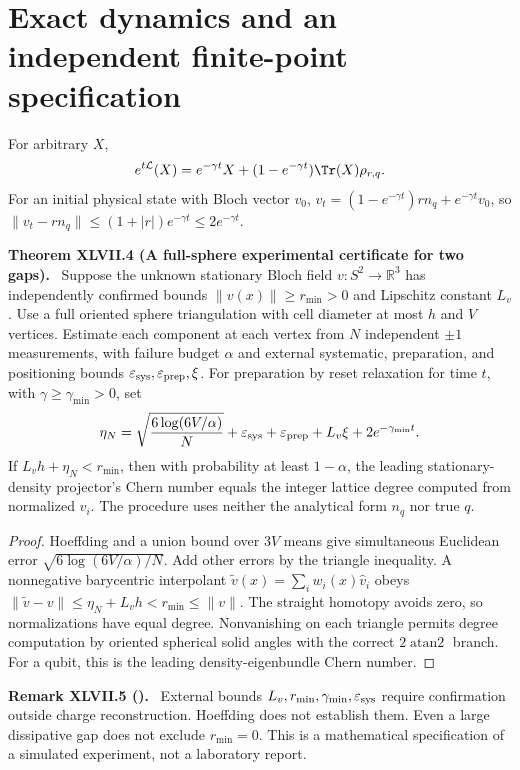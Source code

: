 \documentclass[11pt,a4paper,oneside]{book}
\newcommand{\R}{\mathbb R}\newcommand{\C}{\mathbb C}\newcommand{\Z}{\mathbb Z}\newcommand{\N}{\mathbb N}\newcommand{\Q}{\mathbb Q}
\newcommand{\statement}[3]{\par\medskip\noindent\textbf{#1 #2 (#3).}\ }
\begin{document}
\section{Exact dynamics and an independent finite-point specification}
For arbitrary $X$,
\[e^{t\mathcal L}(X)=e^{-\gamma t}X+(1-e^{-\gamma t})\Tr(X)\rho_{r,q}.\]
For an initial physical state with Bloch vector $v_0$, $v_t=(1-e^{-\gamma t})rn_q+e^{-\gamma t}v_0$, so $\|v_t-rn_q\|\le(1+|r|)e^{-\gamma t}\le2e^{-\gamma t}$.
\statement{Theorem}{XLVII.4}{A full-sphere experimental certificate for two gaps}
Suppose the unknown stationary Bloch field $v:S^2\to\R^3$ has independently confirmed bounds $\|v(x)\|\ge r_{\min}>0$ and Lipschitz constant $L_v$. Use a full oriented sphere triangulation with cell diameter at most $h$ and $V$ vertices. Estimate each component at each vertex from $N$ independent $\pm1$ measurements, with failure budget $\alpha$ and external systematic, preparation, and positioning bounds $\varepsilon_{\rm sys},\varepsilon_{\rm prep},\xi$. For preparation by reset relaxation for time $t$, with $\gamma\ge\gamma_{\min}>0$, set
\[\eta_N=\sqrt{\frac{6\log(6V/\alpha)}N}+\varepsilon_{\rm sys}+\varepsilon_{\rm prep}+L_v\xi+2e^{-\gamma_{\min}t}.\]
If $L_vh+\eta_N<r_{\min}$, then with probability at least $1-\alpha$, the leading stationary-density projector's Chern number equals the integer lattice degree computed from normalized $\widehat v_i$. The procedure uses neither the analytical form $n_q$ nor true $q$.
\begin{proof}
Hoeffding and a union bound over $3V$ means give simultaneous Euclidean error $\sqrt{6\log(6V/\alpha)/N}$. Add other errors by the triangle inequality. A nonnegative barycentric interpolant $\widetilde v(x)=\sum_iw_i(x)\widehat v_i$ obeys $\|\widetilde v-v\|\le\eta_N+L_vh<r_{\min}\le\|v\|$. The straight homotopy avoids zero, so normalizations have equal degree. Nonvanishing on each triangle permits degree computation by oriented spherical solid angles with the correct $2\operatorname{atan2}$ branch. For a qubit, this is the leading density-eigenbundle Chern number.
\end{proof}
\statement{Remark}{XLVII.5}{}
External bounds $L_v,r_{\min},\gamma_{\min},\varepsilon_{\rm sys}$ require confirmation outside charge reconstruction. Hoeffding does not establish them. Even a large dissipative gap does not exclude $r_{\min}=0$. This is a mathematical specification of a simulated experiment, not a laboratory report.
\end{document}
